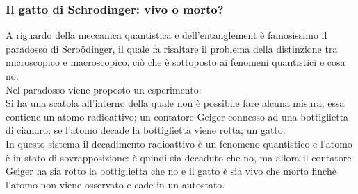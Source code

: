 \subsubsection{Il gatto di Schrodinger: vivo o morto?}
A riguardo della meccanica quantistica e dell'entanglement è famosissimo il paradosso di Scro\"{o}dinger, il quale fa risaltare il problema della distinzione tra microscopico e macroscopico, ciò che è sottoposto ai fenomeni quantistici e cosa no.\\
Nel paradosso viene proposto un esperimento:\\
Si ha una scatola all'interno della quale non è possibile fare alcuna misura; essa contiene un atomo radioattivo; un contatore Geiger connesso ad una bottiglietta di cianuro; se l'atomo decade la bottiglietta viene rotta; un gatto.\\
In questo sistema il decadimento radioattivo è un fenomeno quantistico e l'atomo è in stato di sovrapposizione: è quindi sia decaduto che no, ma allora il contatore Geiger ha sia rotto la bottiglietta che no e il gatto è sia vivo che morto finchè l'atomo non viene osservato e cade in un autostato.